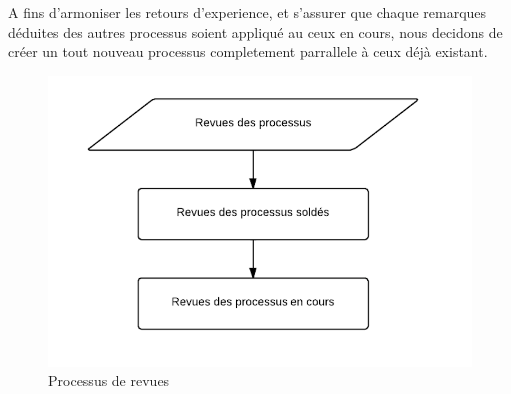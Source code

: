 A fins d'armoniser les retours d'experience, et s'assurer que chaque remarques d\'eduites des autres processus
soient appliqu\'e au ceux en cours, nous decidons de cr\'eer un tout nouveau processus completement parrallele
\`a ceux d\'ej\`a existant.

\begin{figure}[h!]
	\centering
	\includegraphics[width=0.45\linewidth]{images/processus_revues.png}
	\caption{Processus de revues}
	\label{fig:processusRevue}
\end{figure}

